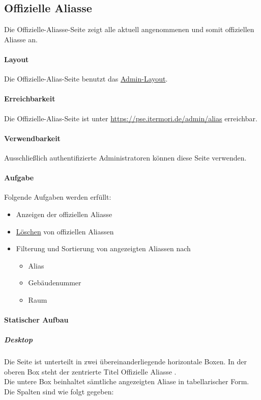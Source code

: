 \newpage
\subsection{Offizielle Aliasse}\label{AP_Offizielle_Aliasse}

Die Offizielle-Aliasse-Seite zeigt alle aktuell angenommenen und somit offiziellen Aliasse an.

\paragraph*{Layout}
Die Offizielle-Alias-Seite benutzt das \hyperref[AP_Admin_Layout]{Admin-Layout}.

\paragraph*{Erreichbarkeit}
Die Offizielle-Alias-Seite ist unter \href{https://pse.itermori.de/admin/alias}{https://pse.itermori.de/admin/alias} erreichbar.

\paragraph*{Verwendbarkeit}
Ausschließlich authentifizierte Administratoren können diese Seite verwenden.

\paragraph*{Aufgabe}
Folgende Aufgaben werden erfüllt:

\begin{itemize}
    \item Anzeigen der offiziellen Aliasse
    \item \hyperref[AP_Aktionen_Offizielle_Aliasse_Loschen]{Löschen} von offiziellen Aliassen
    \item Filterung und Sortierung von angezeigten Aliassen nach 
    \begin{itemize}
        \item Alias
        \item Gebäudenummer
        \item Raum
    \end{itemize}
\end{itemize}

\paragraph*{Statischer Aufbau}
\subparagraph*{Desktop}
Die Seite ist unterteilt in zwei übereinanderliegende horizontale Boxen.
In der oberen Box steht der zentrierte Titel \dq Offizielle Aliasse \dq. \\
Die untere Box beinhaltet sämtliche angezeigten Aliase in tabellarischer Form. Die Spalten sind wie folgt gegeben:

